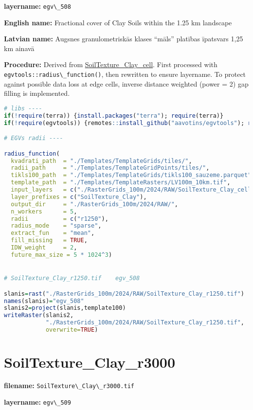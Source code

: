 \documentclass[
]{book}
\newcommand{\passthrough}[1]{#1}
\begin{document}
\textbf{layername:} \passthrough{\lstinline!egv\_508!}

\textbf{English name:} Fractional cover of Clay Soils within the 1.25 km landscape

\textbf{Latvian name:} Augsnes granulometriskās klases ``māls'' platības īpatsvars 1,25 km ainavā

\textbf{Procedure:} Derived from \hyperref[ch06.506]{SoilTexture\_Clay\_cell}. First processed
with \passthrough{\lstinline!egvtools::radius\_function()!}, then rewritten to ensure layername. To protect against
possible data loss at edge cells, inverse distance weighted (power = 2) gap filling
is implemented.

\begin{lstlisting}[language=R]
# libs ----
if(!require(terra)) {install.packages("terra"); require(terra)}
if(!require(egvtools)) {remotes::install_github("aavotins/egvtools"); require(egvtools)}

# EGVs radii ----

radius_function(
  kvadrati_path  = "./Templates/TemplateGrids/tiles/",
  radii_path     = "./Templates/TemplateGridPoints/tiles/",
  tikls100_path  = "./Templates/TemplateGrids/tikls100_sauzeme.parquet",
  template_path  = "./Templates/TemplateRasters/LV100m_10km.tif",
  input_layers   = c("./RasterGrids_100m/2024/RAW/SoilTexture_Clay_cell.tif"),
  layer_prefixes = c("SoilTexture_Clay"),
  output_dir     = "./RasterGrids_100m/2024/RAW/",
  n_workers      = 5,
  radii          = c("r1250"),
  radius_mode    = "sparse",
  extract_fun    = "mean",
  fill_missing   = TRUE,
  IDW_weight     = 2,
  future_max_size = 5 * 1024^3)


# SoilTexture_Clay_r1250.tif    egv_508

slanis=rast("./RasterGrids_100m/2024/RAW/SoilTexture_Clay_r1250.tif")
names(slanis)="egv_508"
slanis2=project(slanis,template100)
writeRaster(slanis2,
            "./RasterGrids_100m/2024/RAW/SoilTexture_Clay_r1250.tif",
            overwrite=TRUE)
\end{lstlisting}

\section{SoilTexture\_Clay\_r3000}\label{ch06.509}

\textbf{filename:} \passthrough{\lstinline!SoilTexture\_Clay\_r3000.tif!}

\textbf{layername:} \passthrough{\lstinline!egv\_509!}
\end{document}
